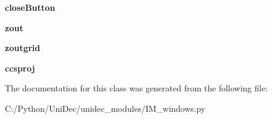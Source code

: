 \begin{DoxyCompactItemize}
\item 
\hypertarget{class_uni_dec_1_1unidec__modules_1_1_i_m__windows_1_1_i_m_tool_extract_a39dbdd7b0a74532f7d4a227a8ba207c4}{}{\bfseries close\+Button}\label{class_uni_dec_1_1unidec__modules_1_1_i_m__windows_1_1_i_m_tool_extract_a39dbdd7b0a74532f7d4a227a8ba207c4}

\item 
\hypertarget{class_uni_dec_1_1unidec__modules_1_1_i_m__windows_1_1_i_m_tool_extract_aba8fe3348d112738d60ef7e05cb42b70}{}{\bfseries zout}\label{class_uni_dec_1_1unidec__modules_1_1_i_m__windows_1_1_i_m_tool_extract_aba8fe3348d112738d60ef7e05cb42b70}

\item 
\hypertarget{class_uni_dec_1_1unidec__modules_1_1_i_m__windows_1_1_i_m_tool_extract_ae88f75e414f8d2ba368303aa5c1bb350}{}{\bfseries zoutgrid}\label{class_uni_dec_1_1unidec__modules_1_1_i_m__windows_1_1_i_m_tool_extract_ae88f75e414f8d2ba368303aa5c1bb350}

\item 
\hypertarget{class_uni_dec_1_1unidec__modules_1_1_i_m__windows_1_1_i_m_tool_extract_a3534a21ab47be0bafd96400123c9ca46}{}{\bfseries ccsproj}\label{class_uni_dec_1_1unidec__modules_1_1_i_m__windows_1_1_i_m_tool_extract_a3534a21ab47be0bafd96400123c9ca46}

\end{DoxyCompactItemize}


The documentation for this class was generated from the following file\+:\begin{DoxyCompactItemize}
\item 
C\+:/\+Python/\+Uni\+Dec/unidec\+\_\+modules/I\+M\+\_\+windows.\+py\end{DoxyCompactItemize}
